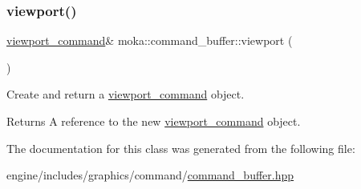 \subsubsection{\texorpdfstring{viewport()}{viewport()}}
{\footnotesize\ttfamily \mbox{\hyperlink{classmoka_1_1viewport__command}{viewport\+\_\+command}}\& moka\+::command\+\_\+buffer\+::viewport (\begin{DoxyParamCaption}{ }\end{DoxyParamCaption})}



Create and return a \mbox{\hyperlink{classmoka_1_1viewport__command}{viewport\+\_\+command}} object. 

\begin{DoxyReturn}{Returns}
A reference to the new \mbox{\hyperlink{classmoka_1_1viewport__command}{viewport\+\_\+command}} object. 
\end{DoxyReturn}


The documentation for this class was generated from the following file\+:\begin{DoxyCompactItemize}
\item 
engine/includes/graphics/command/\mbox{\hyperlink{command__buffer_8hpp}{command\+\_\+buffer.\+hpp}}\end{DoxyCompactItemize}
